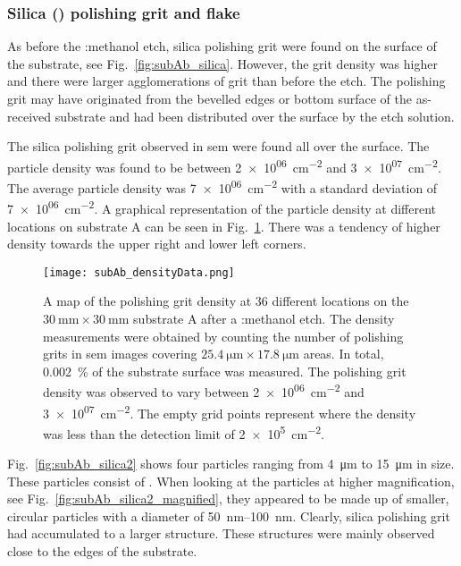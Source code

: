 \subsubsection{Silica () polishing grit and flake}

As before the :methanol etch, silica polishing grit were found on the surface of the substrate, see Fig.~\ref{fig:subAb_silica}. However, the grit density was higher and there were larger agglomerations of grit than before the etch. The polishing grit may have originated from the bevelled edges or bottom surface of the as-received substrate and had been distributed over the surface by the etch solution.

The silica polishing grit observed in \ac{sem} were found all over the surface. The particle density was found to be between \SI{2e+06}{\centi\metre^{-2}} and \SI{3e+07}{\centi\metre^{-2}}. The average particle density was \SI{7e+06}{\centi\metre^{-2}} with a standard deviation of \SI{7e+06}{\centi\metre^{-2}}. A graphical representation of the particle density at different locations on substrate A can be seen in Fig.~\ref{fig:subAb_densityData}. There was a tendency of higher density towards the upper right and lower left corners.

\begin{figure}[htbp]
    \centering
    \texttt{[image: subAb\_densityData.png]}
    \caption[Map of the polishing grit density on substrate A after a :methanol etch.]{A map of the polishing grit density at 36 different locations on the $\SI{30}{\milli\metre}\times\SI{30}{\milli\metre}$ substrate A after a :methanol etch. The density measurements were obtained by counting the number of polishing grits in \ac{sem} images covering $\SI{25.4}{\micro\metre}\times\SI{17.8}{\micro\metre}$ areas. In total, \SI{0.002}{\percent} of the substrate surface was measured. The polishing grit density was observed to vary between \SI{2e+06}{\centi\metre^{-2}} and \SI{3e+07}{\centi\metre^{-2}}. The empty grid points represent where the density was less than the detection limit of \SI{2e+5}{\centi\metre^{-2}}.}
    \label{fig:subAb_densityData}
\end{figure}

Fig.~\ref{fig:subAb_silica2} shows four particles ranging from \SI{4}{\micro\metre} to \SI{15}{\micro\metre} in size. These particles consist of . When looking at the particles at higher magnification, see Fig.~\ref{fig:subAb_silica2_magnified}, they appeared to be made up of smaller, circular particles with a diameter of \SIrange{50}{100}{\nano\metre}. Clearly, silica polishing grit had accumulated to a larger structure. These structures were mainly observed close to the edges of the substrate.

